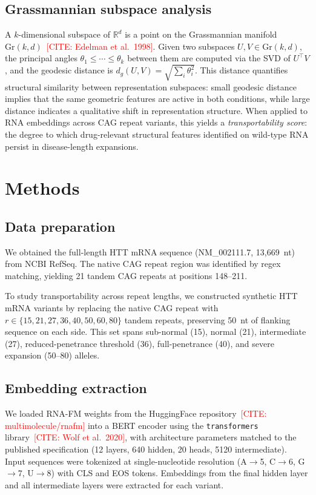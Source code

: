 \documentclass[11pt]{article}
\newcommand{\Gr}{\mathrm{Gr}}
\newcommand{\R}{\mathbb{R}}
\newcommand{\CITE}[1]{\textcolor{red}{[CITE: #1]}}
\begin{document}
\subsection{Grassmannian subspace analysis}

A $k$-dimensional subspace of $\R^d$ is a point on the Grassmannian
manifold $\Gr(k, d)$~\CITE{Edelman et al.~1998}. Given two subspaces
$U, V \in \Gr(k, d)$, the principal angles
$\theta_1 \leq \cdots \leq \theta_k$ between them are computed via the
SVD of $U^\top V$, and the geodesic distance is
$d_g(U, V) = \sqrt{\sum_i \theta_i^2}$.
%
This distance quantifies structural similarity between representation
subspaces: small geodesic distance implies that the same geometric
features are active in both conditions, while large distance indicates
a qualitative shift in representation structure.
%
When applied to RNA embeddings across CAG repeat variants, this yields
a \emph{transportability score}: the degree to which drug-relevant
structural features identified on wild-type RNA persist in disease-length
expansions.


\section{Methods}
\label{sec:methods}

\subsection{Data preparation}

We obtained the full-length HTT mRNA sequence (NM\_002111.7,
13{,}669~nt) from NCBI RefSeq. The native CAG repeat region was
identified by regex matching, yielding 21 tandem CAG repeats at
positions 148--211.

To study transportability across repeat lengths, we constructed
synthetic HTT mRNA variants by replacing the native CAG repeat with
$r \in \{15, 21, 27, 36, 40, 50, 60, 80\}$ tandem repeats, preserving
50~nt of flanking sequence on each side. This set spans
sub-normal (15), normal (21), intermediate (27), reduced-penetrance
threshold (36), full-penetrance (40), and severe expansion (50--80)
alleles.

\subsection{Embedding extraction}

We loaded RNA-FM weights from the HuggingFace
repository~\CITE{multimolecule/rnafm} into a BERT encoder using the
\texttt{transformers} library~\CITE{Wolf et al.~2020}, with
architecture parameters matched to the published
specification (12 layers, 640 hidden, 20 heads, 5120 intermediate).
%
Input sequences were tokenized at single-nucleotide resolution
(A$\to$5, C$\to$6, G$\to$7, U$\to$8) with CLS and EOS tokens.
Embeddings from the final hidden layer and all intermediate layers
were extracted for each variant.
\end{document}
